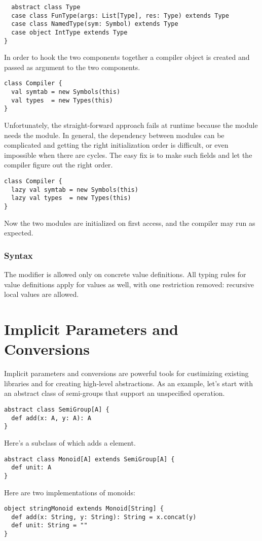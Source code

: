 {\begin{lstlisting}
  abstract class Type
  case class FunType(args: List[Type], res: Type) extends Type
  case class NamedType(sym: Symbol) extends Type
  case object IntType extends Type
}
\end{lstlisting}
In order to hook the two components together a compiler object is
created and passed as argument to the two components. 
\begin{lstlisting}
class Compiler {
  val symtab = new Symbols(this)
  val types  = new Types(this)
}
\end{lstlisting}
Unfortunately, the straight-forward approach fails at runtime because
the \lstinline@symtab@ module needs the \lstinline@types@
module. In general, the dependency between modules can be complicated
and getting the right initialization order is difficult, or even
impossible when there are cycles. The easy fix is to make such fields
\lstinline@lazy@ and let the compiler figure out the right order.
\begin{lstlisting}
class Compiler {
  lazy val symtab = new Symbols(this)
  lazy val types  = new Types(this)
}
\end{lstlisting}
Now the two modules are initialized on first access, and the compiler
may run as expected. 

\subsection*{Syntax}
The \lstinline@lazy@ modifier is allowed only on concrete value
definitions. All typing rules for value definitions apply for
\lstinline@lazy@ values as well, with one restriction removed:
recursive local values are allowed.

\chapter{Implicit Parameters and Conversions}\label{sec:implicits}

Implicit parameters and conversions are powerful tools for
custimizing existing libraries and for creating high-level
abstractions. As an example, let's start with an abstract class of
semi-groups that support an unspecified \lstinline@add@ operation.
\begin{lstlisting}
abstract class SemiGroup[A] {
  def add(x: A, y: A): A
}
\end{lstlisting}
Here's a subclass \lstinline@Monoid@ of \lstinline@SemiGroup@ which adds a
\lstinline@unit@ element.
\begin{lstlisting}
abstract class Monoid[A] extends SemiGroup[A] {
  def unit: A
}
\end{lstlisting}
Here are two implementations of monoids:
\begin{lstlisting}
object stringMonoid extends Monoid[String] {
  def add(x: String, y: String): String = x.concat(y)
  def unit: String = ""
}


\end{lstlisting}}
